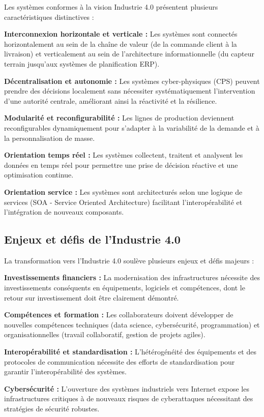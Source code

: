 Les systèmes conformes à la vision Industrie 4.0 présentent plusieurs caractéristiques distinctives :

\textbf{Interconnexion horizontale et verticale :} Les systèmes sont connectés horizontalement au sein de la chaîne de valeur (de la commande client à la livraison) et verticalement au sein de l'architecture informationnelle (du capteur terrain jusqu'aux systèmes de planification ERP).

\textbf{Décentralisation et autonomie :} Les systèmes cyber-physiques (CPS) peuvent prendre des décisions localement sans nécessiter systématiquement l'intervention d'une autorité centrale, améliorant ainsi la réactivité et la résilience.

\textbf{Modularité et reconfigurabilité :} Les lignes de production deviennent reconfigurables dynamiquement pour s'adapter à la variabilité de la demande et à la personnalisation de masse.

\textbf{Orientation temps réel :} Les systèmes collectent, traitent et analysent les données en temps réel pour permettre une prise de décision réactive et une optimisation continue.

\textbf{Orientation service :} Les systèmes sont architecturés selon une logique de services (SOA - Service Oriented Architecture) facilitant l'interopérabilité et l'intégration de nouveaux composants.

\subsection{Enjeux et défis de l'Industrie 4.0}

La transformation vers l'Industrie 4.0 soulève plusieurs enjeux et défis majeurs :

\textbf{Investissements financiers :} La modernisation des infrastructures nécessite des investissements conséquents en équipements, logiciels et compétences, dont le retour sur investissement doit être clairement démontré.

\textbf{Compétences et formation :} Les collaborateurs doivent développer de nouvelles compétences techniques (data science, cybersécurité, programmation) et organisationnelles (travail collaboratif, gestion de projets agiles).

\textbf{Interopérabilité et standardisation :} L'hétérogénéité des équipements et des protocoles de communication nécessite des efforts de standardisation pour garantir l'interopérabilité des systèmes.

\textbf{Cybersécurité :} L'ouverture des systèmes industriels vers Internet expose les infrastructures critiques à de nouveaux risques de cyberattaques nécessitant des stratégies de sécurité robustes.


